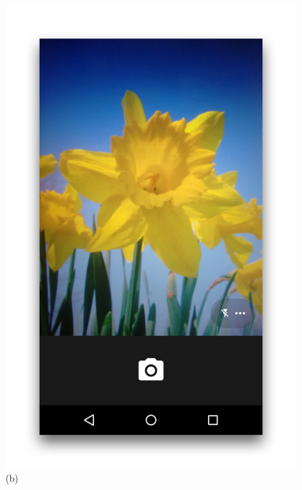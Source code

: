 \documentclass[11pt, a4paper]{report}
\begin{document}
\begin{figure}[h]
\begin{minipage}[b]{0.2\linewidth}
	\includegraphics[totalheight=6cm]{img/40.png}
	(b)
\end{minipage}
\begin{minipage}[b]{0.2\linewidth}
	\centering

\end{minipage}
\end{figure}
\end{document}
